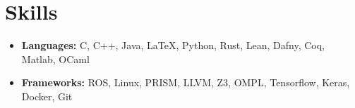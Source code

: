 \section{Skills}

\begin{itemize}
    \item[] \textbf{Languages:} C, C++, Java, \LaTeX, Python, Rust, Lean, Dafny, Coq, Matlab, OCaml
    \vspace{1em}
    \item[] \textbf{Frameworks:} ROS, Linux, PRISM, LLVM, Z3, OMPL, Tensorflow, Keras, Docker, Git
\end{itemize}